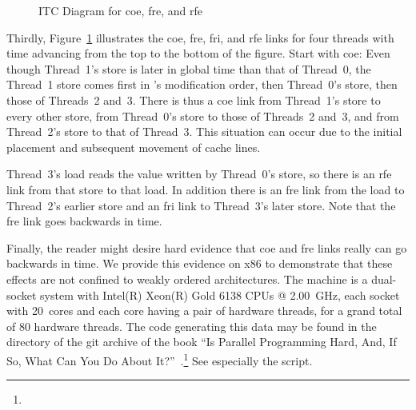 \documentclass[10]{article}
\begin{document}
\begin{figure}[tb]
\begin{center}
\caption{ITC Diagram for coe, fre, and rfe}
\label{fig:ITC Diagram for coe, fre, and rfe}
\end{center}
\end{figure}

Thirdly, Figure~\ref{fig:ITC Diagram for coe, fre, and rfe} illustrates
the coe, fre, fri, and rfe links for four threads with time advancing
from the top to the bottom of the figure.  Start with coe: Even though
Thread~1's store is later in global time than that of Thread~0, the
Thread~1 store comes first in 's modification order, then Thread~0's
store, then those of Threads~2 and~3.
There is thus a coe link from Thread~1's store to every other store,
from Thread~0's store to those of Threads~2 and~3, and from Thread~2's
store to that of Thread~3.
This situation can occur due to the initial placement and subsequent
movement of cache lines.

Thread~3's load reads the value written by Thread~0's store, so there is
an rfe link from that store to that load.  In addition there is an fre link from
the load to Thread~2's earlier store and an fri link to Thread~3's later store.
Note that the fre link goes backwards in time.

Finally, the reader might desire hard evidence that coe and fre
links really can go backwards in time.
We provide this evidence on x86 to demonstrate that these effects
are not confined to weakly ordered architectures.
The machine is a dual-socket system with
Intel(R) Xeon(R) Gold 6138 CPUs @ 2.00~GHz,
each socket with 20~cores and each core having a pair of hardware
threads, for a grand total of 80 hardware threads.
The code generating this data may be found in the 
directory of the git archive of the book
``Is Parallel Programming Hard, And, If So, What Can You Do About
It?''~\cite{McKenney2018ParallelProgramming-2018-12-08a}.\footnote{
	}
See especially the  script.
\end{document}
